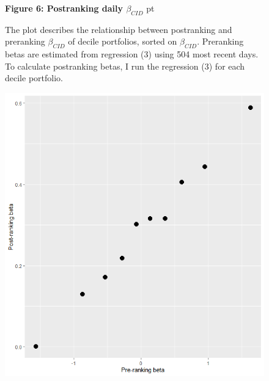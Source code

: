 \documentclass[12pt]{article}
\begin{document}
\begin{figure}
\textbf{Figure 6: Postranking daily $\beta_{CID}$}
 pt
\begin{flushleft}
{The plot describes the relationship between postranking and preranking $\beta_{CID}$ of decile portfolios, sorted on $\beta_{CID}$. Preranking betas are estimated from regression (3) using 504 most recent days. To calculate postranking betas, I run the  regression (3) for each decile portfolio.}
\end{flushleft}
\centering
\includegraphics[width=1\textwidth]{paper_b3/Figure2.png}
\end{figure}
\end{document}
